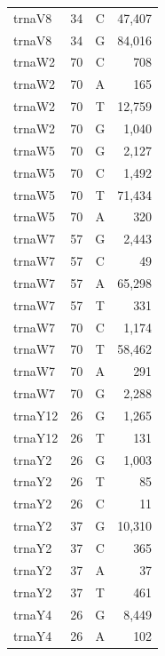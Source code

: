 \documentclass[12pt]{rockefeller}
\begin{document}
\begin{tiny}
\begin{longtable}{|l|r|c|r|}
  trnaV8 &        34 &          C &     47,407 \\
  trnaV8 &        34 &          G &     84,016 \\
  trnaW2 &        70 &          C &        708 \\
  trnaW2 &        70 &          A &        165 \\
  trnaW2 &        70 &          T &     12,759 \\
  trnaW2 &        70 &          G &      1,040 \\
  trnaW5 &        70 &          G &      2,127 \\
  trnaW5 &        70 &          C &      1,492 \\
  trnaW5 &        70 &          T &     71,434 \\
  trnaW5 &        70 &          A &        320 \\
  trnaW7 &        57 &          G &      2,443 \\
  trnaW7 &        57 &          C &         49 \\
  trnaW7 &        57 &          A &     65,298 \\
  trnaW7 &        57 &          T &        331 \\
  trnaW7 &        70 &          C &      1,174 \\
  trnaW7 &        70 &          T &     58,462 \\
  trnaW7 &        70 &          A &        291 \\
  trnaW7 &        70 &          G &      2,288 \\
 trnaY12 &        26 &          G &      1,265 \\
 trnaY12 &        26 &          T &        131 \\
  trnaY2 &        26 &          G &      1,003 \\
  trnaY2 &        26 &          T &         85 \\
  trnaY2 &        26 &          C &         11 \\
  trnaY2 &        37 &          G &     10,310 \\
  trnaY2 &        37 &          C &        365 \\
  trnaY2 &        37 &          A &         37 \\
  trnaY2 &        37 &          T &        461 \\
  trnaY4 &        26 &          G &      8,449 \\
  trnaY4 &        26 &          A &        102 \\

\end{longtable}
\end{tiny}
\end{document}
